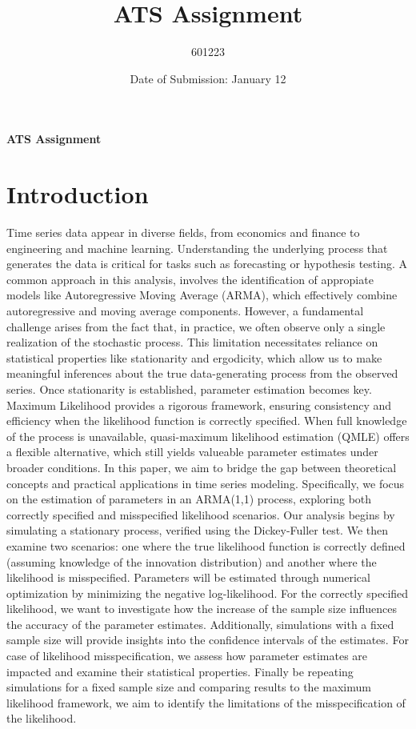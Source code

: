 \documentclass[12pt]{article}
\begin{document}
\clearpage
\title{ATS Assignment}
\author{601223}
\date{Date of Submission: January 12}

\begin{titlepage}
\textbf{\Large ATS Assignment}
\end{titlepage}

\tableofcontents

\newpage

\section{Introduction}
Time series data appear in diverse fields, from economics and finance to engineering and machine learning. 
Understanding the underlying process that generates the data is critical for tasks such as forecasting or hypothesis testing.
A common approach in this analysis, involves the identification of appropiate models like Autoregressive Moving Average (ARMA), which effectively combine autoregressive and moving average components.
However, a fundamental challenge arises from the fact that, in practice, we often observe only a single realization of the stochastic process. This limitation necessitates reliance on statistical properties like stationarity and ergodicity, which allow us to make meaningful inferences about the true data-generating process from the observed series.
Once stationarity is established, parameter estimation becomes key. 
Maximum Likelihood provides a rigorous framework, ensuring consistency and efficiency when the likelihood function is correctly specified. When full knowledge of the process is unavailable, quasi-maximum likelihood estimation (QMLE) offers a flexible alternative, which still yields valueable parameter estimates under broader conditions.
In this paper, we aim to bridge the gap between theoretical concepts and practical applications in time series modeling.
Specifically, we focus on the estimation of parameters in an ARMA(1,1) process, exploring both correctly specified and misspecified likelihood scenarios.
Our analysis begins by simulating a stationary process, verified using the Dickey-Fuller test. We then examine two scenarios: one where the true likelihood function is correctly defined (assuming knowledge of the innovation distribution) and another where the likelihood is misspecified. Parameters will be estimated through numerical optimization by minimizing the negative log-likelihood.
For the correctly specified likelihood, we want to investigate how the increase of the sample size influences the accuracy of the parameter estimates. Additionally, simulations with a fixed sample size will provide insights into the confidence intervals of the estimates.
For case of likelihood misspecification, we assess how parameter estimates are impacted and examine their statistical properties. 
Finally be repeating simulations for a fixed sample size and comparing results to the maximum likelihood framework, we aim to identify the limitations of the misspecification of the likelihood.
\end{document}
